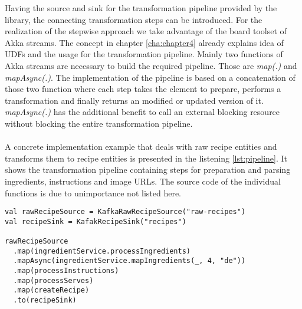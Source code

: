 Having the source and sink for the transformation pipeline provided by the library, the connecting transformation steps can be introduced. For the realization of the stepwise approach we take advantage of the board toolset of Akka streams. The concept in chapter \ref{cha:chapter4} already explains idea of UDFs and the usage for the transformation pipeline. Mainly two functions of Akka streams are necessary to build the required pipeline. Those are \textit{map(.)} and \textit{mapAsync(.)}. The implementation of the pipeline is based on a concatenation of those two function where each step takes the element to prepare, performs a transformation and finally returns an modified or updated version of it. \textit{mapAsync(.)} has the additional benefit to call an external blocking resource without blocking the entire transformation pipeline. 
\\\\
A concrete implementation example that deals with raw recipe entities and transforms them to recipe entities is presented in the listening \ref{lst:pipeline}. It shows the transformation pipeline containing steps for preparation and parsing ingredients, instructions and image URLs. The source code of the individual functions is due to unimportance not listed here.

\begin{lstlisting}[style=myScalastyle,label={lst:pipeline},caption={Example transformation pipeline for raw recipes to recipes}]
val rawRecipeSource = KafkaRawRecipeSource("raw-recipes")
val recipeSink = KafakRecipeSink("recipes")

rawRecipeSource
  .map(ingredientService.processIngredients)
  .mapAsync(ingredientService.mapIngredients(_, 4, "de"))
  .map(processInstructions)
  .map(processServes)
  .map(createRecipe)
  .to(recipeSink)
\end{lstlisting}

